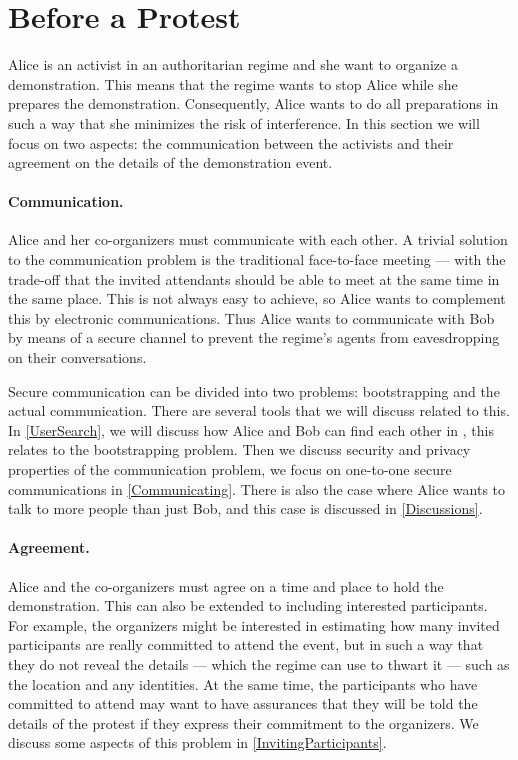 \section{Before a Protest}
\label{BeforeProtest}

Alice is an activist in an authoritarian regime and she want to organize 
a demonstration.
This means that the regime wants to stop Alice while she prepares the 
demonstration.
Consequently, Alice wants to do all preparations in such a way that she 
minimizes the risk of interference.
In this section we will focus on two aspects: the communication between the 
activists and their agreement on the details of the demonstration event.

\paragraph{Communication.}

Alice and her co-organizers must communicate with each other.
A trivial solution to the communication problem is the traditional face-to-face 
meeting --- with the trade-off that the invited attendants should be able to 
meet at the same time in the same place.
This is not always easy to achieve, so Alice wants to complement this by 
electronic communications.
Thus Alice wants to communicate with Bob by means of a secure channel to 
prevent the regime's agents from eavesdropping on their conversations.

Secure communication can be divided into two problems: bootstrapping and the 
actual communication.
There are several tools that we will discuss related to this.
In \cref{UserSearch}, we will discuss how Alice and Bob can find each other in 
, this relates to the bootstrapping problem.
Then we discuss security and privacy properties of the communication problem, 
we focus on one-to-one secure communications in \cref{Communicating}.
There is also the case where Alice wants to talk to more people than just Bob, 
and this case is discussed in \cref{Discussions}.

\paragraph{Agreement.}

Alice and the co-organizers must agree on a time and place to hold the 
demonstration.
This can also be extended to including interested participants.
For example, the organizers might be interested in estimating how many invited 
participants are really committed to attend the event, but in such a way that 
they do not reveal the details --- which the regime can use to thwart it --- 
such as the location and any identities.
At the same time, the participants who have committed to attend may want to 
have assurances that they will be told the details of the protest if they 
express their commitment to the organizers.
We discuss some aspects of this problem in \cref{InvitingParticipants}.










%
